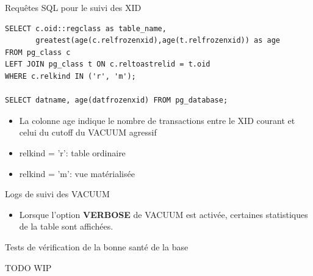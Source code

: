 \begin{frame}[fragile]{Requêtes SQL pour le suivi des XID}

\begin{tiny}
\begin{Verbatim}[commandchars=\\\{\}]
SELECT c.oid::regclass as table_name,
       greatest(age(c.relfrozenxid),age(t.relfrozenxid)) as age
FROM pg_class c
LEFT JOIN pg_class t ON c.reltoastrelid = t.oid
WHERE c.relkind IN ('r', 'm');

SELECT datname, age(datfrozenxid) FROM pg_database;
\end{Verbatim}
\end{tiny}

\begin{itemize}
   \item La colonne age indique le nombre de transactions entre le XID courant et celui du cutoff du VACUUM agressif
   \item relkind = 'r': table ordinaire
   \item relkind = 'm': vue matérialisée
\end{itemize}

\begin{toile}
\end{toile}

\end{frame}


\begin{frame}{Logs de suivi des VACUUM}

\begin{itemize}
   \item Lorsque l'option \textbf{VERBOSE} de VACUUM est activée, certaines statistiques de la table sont affichées.
\end{itemize}

\end{frame}


\begin{frame}[fragile]{Tests de vérification de la bonne santé de la base}

   TODO
   WIP

\begin{toile}
\end{toile}

\end{frame}

